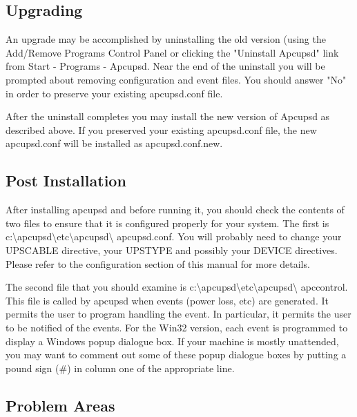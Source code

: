 {{{{{{{{{\label{Upgrading}
\subsection*{Upgrading}

An upgrade may be accomplished by uninstalling the old version (using
the Add/Remove Programs Control Panel or clicking the "Uninstall Apcupsd" 
link from Start -\gt{} Programs -\gt{} Apcupsd. Near the end of the
uninstall you will be prompted about removing configuration and event
files. You should answer "No" in order to preserve your existing
apcupsd.conf file.

After the uninstall completes you may install the new version of
Apcupsd as described above. If you preserved your existing apcupsd.conf
file, the new apcupsd.conf will be installed as apcupsd.conf.new.

\label{Post-Installation}
\subsection*{Post Installation}

\label{index-Windows_002c-Post-Installation-177}
After installing apcupsd and before running it, you should check the contents
of two files to ensure that it is configured properly for your system. The
first is
c:\textbackslash{}apcupsd\textbackslash{}etc\textbackslash{}apcupsd\textbackslash
{}apcupsd.conf. You will probably need to change your UPSCABLE directive, your
UPSTYPE and possibly your DEVICE directives. Please refer to the configuration
section of this manual for more details.  

The second file that you should examine is
c:\textbackslash{}apcupsd\textbackslash{}etc\textbackslash{}apcupsd\textbackslash
{}apccontrol. This file is called by apcupsd when events (power loss, etc) are
generated. It permits the user to program handling the event. In particular,
it permits the user to be notified of the events. For the Win32 version, each
event is programmed to display a Windows popup dialogue box. If your machine
is mostly unattended, you may want to comment out some of these popup dialogue
boxes by putting a pound sign (\#) in column one of the appropriate line. 

\label{Problem-Areas}

\subsection*{Problem Areas}

}}}}}}}}}
